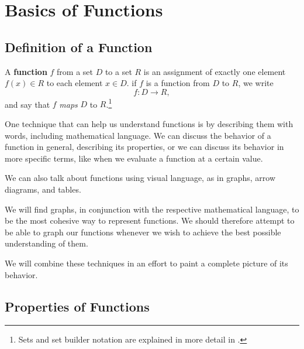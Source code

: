 \chapter{Basics of Functions}
\section{Definition of a Function}


\begin{defn}
    A \textbf{function} \(f\) from a set \(D\) to a set \(R\) is an assignment of exactly one element \(f(x) \in R\) to each element \(x \in D\).
    if $f$ is a function from $D$ to $R$, we write
    \begin{equation}
        f:D \to R,
        \label{eq:function_definition}
    \end{equation}
    and say that $f$ \emph{maps} $D$ to $R$.\footnote{Sets and set builder notation are explained in more detail in .}
\end{defn}

One technique that can help us understand functions is by describing them with words,
including mathematical language.
We can discuss the behavior of a function in general,
describing its properties, or we can discuss its behavior in more specific terms,
like when we evaluate a function at a certain value.

We can also talk about functions using visual language, as in graphs, arrow diagrams, and tables.

We will find graphs, in conjunction with the respective mathematical language, to be the most cohesive way to represent functions.
We should therefore attempt to be able to graph our functions whenever we wish to achieve the best possible understanding of them.

We will combine these techniques in an effort to paint a complete picture of its behavior.

\section{Properties of Functions}


